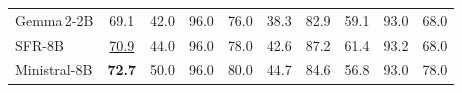 \documentclass{article}
\newcommand{\pp}{\,pp}
\theoremstyle{plain}
\theoremstyle{definition}
\theoremstyle{remark}
\begin{document}
\begin{table}[t]
\begin{tabular}{lccccccccc}
Gemma\,2-2B    & 69.1 & 42.0 & 96.0 & 76.0 & 38.3 & 82.9 & 59.1 & 93.0 & 68.0 \\
SFR-8B         & \underline{70.9} & 44.0 & 96.0 & 78.0 & 42.6 & 87.2 & 61.4 & 93.2 & 68.0 \\
Ministral-8B   & \textbf{72.7} & 50.0 & 96.0 & 80.0 & 44.7 & 84.6 & 56.8 & 93.0 & 78.0 \\
\bottomrule
\end{tabular}
\end{table}



\end{document}

